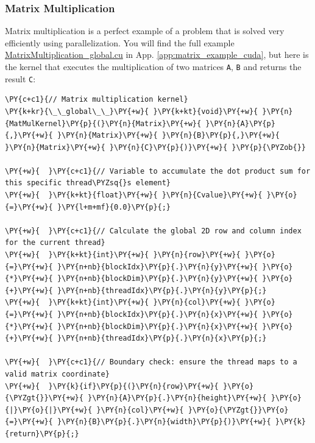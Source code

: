 \subsubsection{Matrix Multiplication}

Matrix multiplication is a perfect example of a problem that is solved very efficiently using parallelization. You will find the full example \underline{MatrixMultiplication\_global.cu} in App. \ref{app:matrix_example_cuda}, but here is the kernel that executes the multiplication of two matrices \texttt{A}, \texttt{B} and returns the result \texttt{C}:

\begin{Verbatim}[commandchars=\\\{\}]
\PY{c+c1}{// Matrix multiplication kernel}
\PY{k+kr}{\_\_global\_\_}\PY{+w}{ }\PY{k+kt}{void}\PY{+w}{ }\PY{n}{MatMulKernel}\PY{p}{(}\PY{n}{Matrix}\PY{+w}{ }\PY{n}{A}\PY{p}{,}\PY{+w}{ }\PY{n}{Matrix}\PY{+w}{ }\PY{n}{B}\PY{p}{,}\PY{+w}{ }\PY{n}{Matrix}\PY{+w}{ }\PY{n}{C}\PY{p}{)}\PY{+w}{ }\PY{p}{\PYZob{}}

\PY{+w}{  }\PY{c+c1}{// Variable to accumulate the dot product sum for this specific thread\PYZsq{}s element}
\PY{+w}{  }\PY{k+kt}{float}\PY{+w}{ }\PY{n}{Cvalue}\PY{+w}{ }\PY{o}{=}\PY{+w}{ }\PY{l+m+mf}{0.0}\PY{p}{;}

\PY{+w}{  }\PY{c+c1}{// Calculate the global 2D row and column index for the current thread}
\PY{+w}{  }\PY{k+kt}{int}\PY{+w}{ }\PY{n}{row}\PY{+w}{ }\PY{o}{=}\PY{+w}{ }\PY{n+nb}{blockIdx}\PY{p}{.}\PY{n}{y}\PY{+w}{ }\PY{o}{*}\PY{+w}{ }\PY{n+nb}{blockDim}\PY{p}{.}\PY{n}{y}\PY{+w}{ }\PY{o}{+}\PY{+w}{ }\PY{n+nb}{threadIdx}\PY{p}{.}\PY{n}{y}\PY{p}{;}
\PY{+w}{  }\PY{k+kt}{int}\PY{+w}{ }\PY{n}{col}\PY{+w}{ }\PY{o}{=}\PY{+w}{ }\PY{n+nb}{blockIdx}\PY{p}{.}\PY{n}{x}\PY{+w}{ }\PY{o}{*}\PY{+w}{ }\PY{n+nb}{blockDim}\PY{p}{.}\PY{n}{x}\PY{+w}{ }\PY{o}{+}\PY{+w}{ }\PY{n+nb}{threadIdx}\PY{p}{.}\PY{n}{x}\PY{p}{;}

\PY{+w}{  }\PY{c+c1}{// Boundary check: ensure the thread maps to a valid matrix coordinate}
\PY{+w}{  }\PY{k}{if}\PY{p}{(}\PY{n}{row}\PY{+w}{ }\PY{o}{\PYZgt{}}\PY{+w}{ }\PY{n}{A}\PY{p}{.}\PY{n}{height}\PY{+w}{ }\PY{o}{|}\PY{o}{|}\PY{+w}{ }\PY{n}{col}\PY{+w}{ }\PY{o}{\PYZgt{}}\PY{o}{=}\PY{+w}{ }\PY{n}{B}\PY{p}{.}\PY{n}{width}\PY{p}{)}\PY{+w}{ }\PY{k}{return}\PY{p}{;}


\end{Verbatim}
